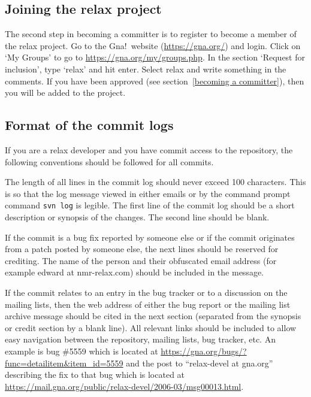 \subsection{Joining the relax project}

The second step in becoming a committer is to register to become a member of the relax project.  Go to the Gna!\ website (\href{https://gna.org/}{https://gna.org/}) and login.  Click on `My Groups' to go to \href{https://gna.org/my/groups.php}{https://gna.org/my/groups.php}.  In the section `Request for inclusion', type `relax' and hit enter.  Select relax and write something in the comments.  If you have been approved (see section~\ref{becoming a committer}), then you will be added to the project.


\subsection{Format of the commit logs}\label{commit log format}

If you are a relax developer and you have commit access to the repository, the following conventions should be followed for all commits.

The length of all lines in the commit log should never exceed 100 characters.  This is so that the log message viewed in either emails or by the command prompt command \mbox{\texttt{svn log}} is legible.  The first line of the commit log should be a short description or synopsis of the changes.  The second line should be blank.

If the commit is a bug fix reported by someone else or if the commit originates from a patch posted by someone else, the next lines should be reserved for crediting.  The name of the person and their obfuscated email address (for example edward at nmr-relax.com) should be included in the message.

If the commit relates to an entry in the bug tracker or to a discussion on the mailing lists, then the web address of either the bug report or the mailing list archive message should be cited in the next section (separated from the synopsis or credit section by a blank line).  All relevant links should be included to allow easy navigation between the repository, mailing lists, bug tracker, etc.  An example is bug \#5559 which is located at \href{https://gna.org/bugs/?func=detailitem\&item\_id=5559}{https://gna.org/bugs/?func=detailitem\&item\_id=5559} and the post to ``relax-devel at gna.org'' describing the fix to that bug which is located at \href{https://mail.gna.org/public/relax-devel/2006-03/msg00013.html}{https://mail.gna.org/public/relax-devel/2006-03/msg00013.html}.

